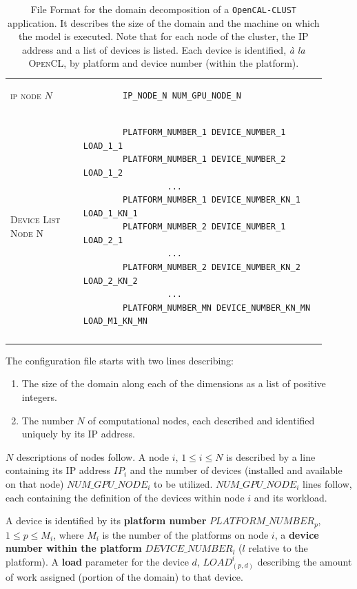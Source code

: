 \begin{table}
\begin{tabular}{m{0.21\linewidth}| m{0.7\linewidth}}
\tabularnewline
\midrule


\textsc{ip node $N$}   & 
\begin{verbatim}
        IP_NODE_N NUM_GPU_NODE_N
\end{verbatim}
\tabularnewline
\textsc{Device List Node N}  & 
\begin{verbatim}
        PLATFORM_NUMBER_1 DEVICE_NUMBER_1 LOAD_1_1
        PLATFORM_NUMBER_1 DEVICE_NUMBER_2 LOAD_1_2
                 ...
        PLATFORM_NUMBER_1 DEVICE_NUMBER_KN_1 LOAD_1_KN_1
        PLATFORM_NUMBER_2 DEVICE_NUMBER_1  LOAD_2_1
                 ...
        PLATFORM_NUMBER_2 DEVICE_NUMBER_KN_2 LOAD_2_KN_2
                 ...
        PLATFORM_NUMBER_MN DEVICE_NUMBER_KN_MN LOAD_M1_KN_MN
\end{verbatim}
\\ \tabularnewline
\bottomrule
        
\end{tabular}
\caption[File Format for the domain decomposition of a \texttt{OpenCAL-CLUST} application.]{File Format for the domain decomposition of a \texttt{OpenCAL-CLUST} application. It describes the size of the domain and the machine on which the model is executed. Note that for each node of the cluster, the IP address and a list of devices is listed. Each device is identified, \textit{\`a la} \textsc{OpenCL}, by platform and device number (within the platform).}
\label{code:file_syntax}
\end{table}
\captionsetup[table]{name=Table}

The configuration file starts with two lines describing:
\begin{enumerate}
    \item The size of the domain along each of the dimensions as a list of positive integers.
    \item The number $N$ of computational nodes, each described and identified uniquely by its IP address.
\end{enumerate}
$N$ descriptions of nodes follow.
A node $i$, $1 \leq i \leq N$ is described by a line containing its IP address $IP_i$ and the number of devices (installed and available on that node) $NUM\_GPU\_NODE_i$ to be utilized.
$NUM\_GPU\_NODE_i$ lines follow, each containing the definition of the devices within node $i$ and its workload. 

A device is identified by its \textbf{platform number} $PLATFORM\_NUMBER_p$, $1 \leq p \leq M_i$, where $M_i$ is the number of the platforms on node $i$, a \textbf{device number within the platform} $DEVICE\_NUMBER_l$ ($l$ relative to the platform). A \textbf{load} parameter for the device $d$, $LOAD^i_{(p,d)}$ describing the amount of work assigned (portion of the domain) to that device.

